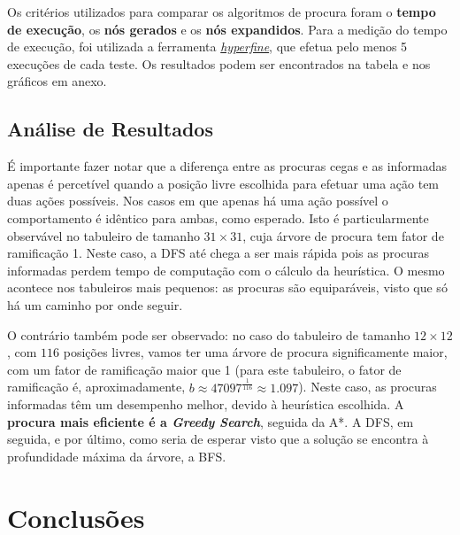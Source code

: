 \documentclass[12pt,a4paper]{article}
\begin{document}
Os critérios utilizados para comparar os algoritmos de procura foram o \textbf{tempo de execução},
os \textbf{nós gerados} e os \textbf{nós expandidos}.
Para a medição do tempo de execução, foi utilizada a ferramenta \href{https://github.com/sharkdp/hyperfine}{\textit{hyperfine}},
que efetua pelo menos 5 execuções de cada teste.
Os resultados podem ser encontrados na tabela e nos gráficos em anexo.

\subsection{Análise de Resultados}

É importante fazer notar que a diferença entre as procuras cegas e as informadas
apenas é percetível quando a posição livre escolhida para efetuar uma ação tem duas ações possíveis.
Nos casos em que apenas há uma ação possível o comportamento é idêntico para ambas, como esperado.
Isto é particularmente observável no tabuleiro de tamanho \(31 \times 31\), cuja árvore de procura tem fator de ramificação 1. 
Neste caso, a DFS até chega a ser mais rápida pois as procuras informadas perdem tempo de computação com o cálculo da heurística.
O mesmo acontece nos tabuleiros mais pequenos:
as procuras são equiparáveis, visto que só há um caminho por onde seguir.

O contrário também pode ser observado: no caso do tabuleiro de tamanho \(12 \times 12\), com \(116\) posições
livres, vamos ter uma árvore de procura significamente maior,
com um fator de ramificação maior que 1 (para este tabuleiro, o fator de ramificação é,
aproximadamente, \(b \approx 47097^{\frac{1}{116}} \approx 1.097\)).
Neste caso, as procuras informadas têm um desempenho melhor, devido à heurística escolhida.
A \textbf{procura mais eficiente é a \textit{Greedy Search}}, seguida da A*.
A DFS, em seguida, e por último, como seria de esperar visto que a solução se encontra
à profundidade máxima da árvore, a BFS.

\section{Conclusões}
\end{document}
